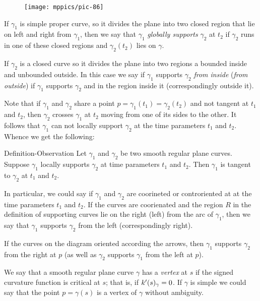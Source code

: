 \begin{figure}
\vskip-3mm
\centering
\texttt{[image: mppics/pic-86]}
\vskip0mm
\end{figure}

If $\gamma_1$ is simple proper curve, so it divides the plane into two closed region that lie on left and right from $\gamma_1$, then we say that $\gamma_1$ \emph{globally supports} $\gamma_2$ at $t_2$ 
if $\gamma_2$ runs in one of these closed regions and 
$\gamma_2(t_2)$ lies on $\gamma$.

If $\gamma_2$ is a closed curve so it divides the plane into two regions a bounded inside and unbounded outside.
In this case we say if $\gamma_1$ supports $\gamma_2$ \emph{from inside} (\emph{from outside}) if $\gamma_1$ supports $\gamma_2$ and in the region inside it (correspondingly outside it). 

Note that if $\gamma_1$ and $\gamma_2$ share a point $p=\gamma_1(t_1)=\gamma_2(t_2)$ and not tangent at $t_1$ and $t_2$, then  $\gamma_2$ crosses $\gamma_1$ at $t_2$ moving from one of its sides to the other.
It follows that $\gamma_1$ can not locally support $\gamma_2$ at the time parameters $t_1$ and $t_2$.
Whence we get the following:

\begin{thm}{Definition-Observation}
Let $\gamma_1$ and $\gamma_2$ be two smooth regular plane curves.
Suppose $\gamma_1$ locally supports $\gamma_2$ at time parameters $t_1$ and $t_2$.
Then $\gamma_1$ is tangent to $\gamma_2$ at $t_1$ and $t_2$.

In particular, we could say if $\gamma_1$ and $\gamma_2$ are coorineted or controriented at at the time parameters $t_1$ and $t_2$.
If the curves are coorienated and the region $R$ in the definition of supporting curves lie on the right (left) from the arc of $\gamma_1$, then we say that 
$\gamma_1$ supports $\gamma_2$ from the left (correspondingly right).
\end{thm}

If the curves on the diagram oriented according the arrows, then $\gamma_1$ supports $\gamma_2$ from the right at $p$ (as well as $\gamma_2$ supports $\gamma_1$ from the left at $p$).

We say that a smooth regular plane curve $\gamma$ has a \emph{vertex} at $s$
if the signed curvature function is critical at $s$;
that is, if $k'(s)_\gamma=0$.
If $\gamma$ is simple we could say that the point $p=\gamma(s)$ is a vertex of $\gamma$ without ambiguity.

